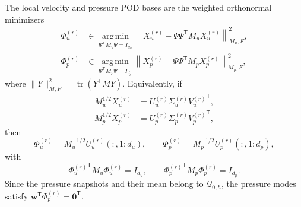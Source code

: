 The local velocity and pressure POD bases are the weighted orthonormal
minimizers
\begin{align}
  \Phi_u^{(r)}
  &\in
  \underset{\Psi^{\mathsf T}M_u\Psi=I_{d_u}}
  {\operatorname{arg\,min}}
  \left\|
    X_u^{(r)}-\Psi\Psi^{\mathsf T}M_uX_u^{(r)}
  \right\|_{M_u,F}^{2},
  \label{eq:velocity_pod_minimization}\\
  \Phi_p^{(r)}
  &\in
  \underset{\Psi^{\mathsf T}M_p\Psi=I_{d_p}}
  {\operatorname{arg\,min}}
  \left\|
    X_p^{(r)}-\Psi\Psi^{\mathsf T}M_pX_p^{(r)}
  \right\|_{M_p,F}^{2},
  \label{eq:pressure_pod_minimization}
\end{align}
where $\|Y\|_{M,F}^{2}=\operatorname{tr}(Y^{\mathsf T}MY)$.  Equivalently,
if
\begin{align}
  M_u^{1/2}X_u^{(r)}
  &=U_u^{(r)}\Sigma_u^{(r)}{V_u^{(r)}}^{\mathsf T},\\
  M_p^{1/2}X_p^{(r)}
  &=U_p^{(r)}\Sigma_p^{(r)}{V_p^{(r)}}^{\mathsf T},
\end{align}
then
\begin{equation}
  \Phi_u^{(r)}
  =M_u^{-1/2}U_u^{(r)}(:,1\!:\!d_u),
  \qquad
  \Phi_p^{(r)}
  =M_p^{-1/2}U_p^{(r)}(:,1\!:\!d_p),
  \label{eq:weighted_pod_bases}
\end{equation}
with
\begin{equation}
  {\Phi_u^{(r)}}^{\mathsf T}M_u\Phi_u^{(r)}=I_{d_u},
  \qquad
  {\Phi_p^{(r)}}^{\mathsf T}M_p\Phi_p^{(r)}=I_{d_p}.
  \label{eq:weighted_pod_orthogonality}
\end{equation}
Since the pressure snapshots and their mean belong to
$\mathcal{Q}_{0,h}$, the pressure modes satisfy
$\boldsymbol{w}^{\mathsf T}\Phi_p^{(r)}=\boldsymbol{0}^{\mathsf T}$.

